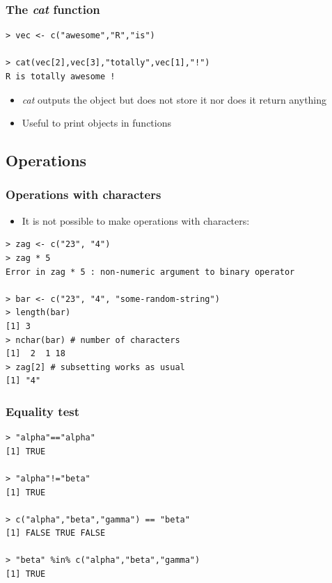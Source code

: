 \documentclass[xcolor=dvipsnames, xcolor=table]{beamer} %
\theoremstyle{mystyle}
\begin{document}
\begin{frame}[fragile] %

\frametitle{The \textit{cat} function}

\begin{verbatim}
> vec <- c("awesome","R","is")

> cat(vec[2],vec[3],"totally",vec[1],"!")
R is totally awesome !
\end{verbatim}

\begin{itemize}
\item \textit{cat} outputs the object but does not store it nor does it return anything
\item Useful to print objects in functions
\end{itemize}

\end{frame}

\subsection{Operations}

\begin{frame}[fragile] %
\frametitle{Operations with characters}

\begin{itemize} 
\item It is not possible to make operations with characters:
\end{itemize}

\begin{verbatim}
> zag <- c("23", "4")
> zag * 5
Error in zag * 5 : non-numeric argument to binary operator
 
> bar <- c("23", "4", "some-random-string")
> length(bar)
[1] 3
> nchar(bar) # number of characters
[1]  2  1 18
> zag[2] # subsetting works as usual 
[1] "4"

\end{verbatim}

\end{frame}




\begin{frame}[fragile] %

\frametitle{Equality test}

\begin{verbatim}
> "alpha"=="alpha"
[1] TRUE

> "alpha"!="beta"
[1] TRUE

> c("alpha","beta","gamma") == "beta"
[1] FALSE TRUE FALSE

> "beta" %in% c("alpha","beta","gamma") 
[1] TRUE

\end{verbatim}

\end{frame}
\end{document}
